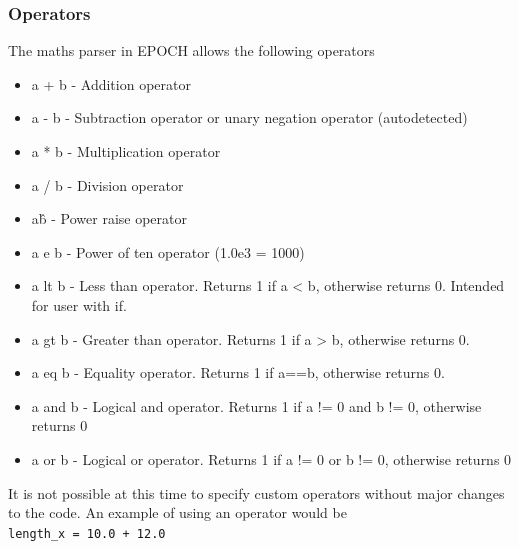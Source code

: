 \documentclass[12pt]{article}
\begin{document}
\subsubsection{Operators}
The maths parser in EPOCH allows the following operators
\begin{itemize}
\item a + b - Addition operator
\item a - b - Subtraction operator or unary negation operator (autodetected)
\item a * b - Multiplication operator
\item a / b - Division operator
\item a\^b - Power raise operator
\item a e b - Power of ten operator (1.0e3 = 1000)
\item a lt b - Less than operator. Returns 1 if a < b, otherwise returns 0. Intended for user with if.
\item a gt b - Greater than operator. Returns 1 if a > b, otherwise returns 0.
\item a eq b - Equality operator. Returns 1 if a==b, otherwise returns 0.
\item a and b - Logical and operator. Returns 1 if a != 0 and b != 0, otherwise returns 0
\item a or b - Logical or operator. Returns 1 if a != 0 or b != 0, otherwise returns 0
\end{itemize}
It is not possible at this time to specify custom operators without major changes to the code. An example of using an operator would be\\
\texttt{length\_x = 10.0 + 12.0}\\
\end{document}
